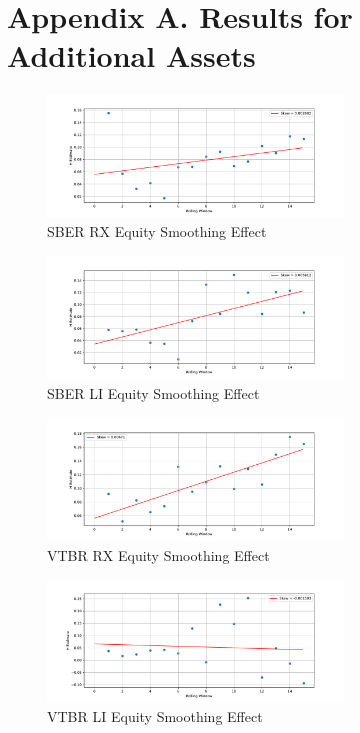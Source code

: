 \section*{Appendix A. Results for Additional Assets}
    \noindent
    
    

    \begin{figure}[h]
        \centering
        \includegraphics[width=0.7\textwidth]{fig/SBER RX Equity Smoothing Effect.pdf}
        \caption{SBER RX Equity Smoothing Effect}
    \end{figure}

    \begin{figure}[h]
        \centering
        \includegraphics[width=0.7\textwidth]{fig/SBER LI Equity Smoothing Effect.pdf}
        \caption{SBER LI Equity Smoothing Effect}
    \end{figure} 

    \begin{figure}[h]
        \centering
        \includegraphics[width=0.7\textwidth]{fig/VTBR RX Equity Smoothing Effect.pdf}
        \caption{VTBR RX Equity Smoothing Effect}
    \end{figure} 

    \begin{figure}[h]
        \centering
        \includegraphics[width=0.7\textwidth]{fig/VTBR LI Equity Smoothing Effect.pdf}
        \caption{VTBR LI Equity Smoothing Effect}
    \end{figure} 

